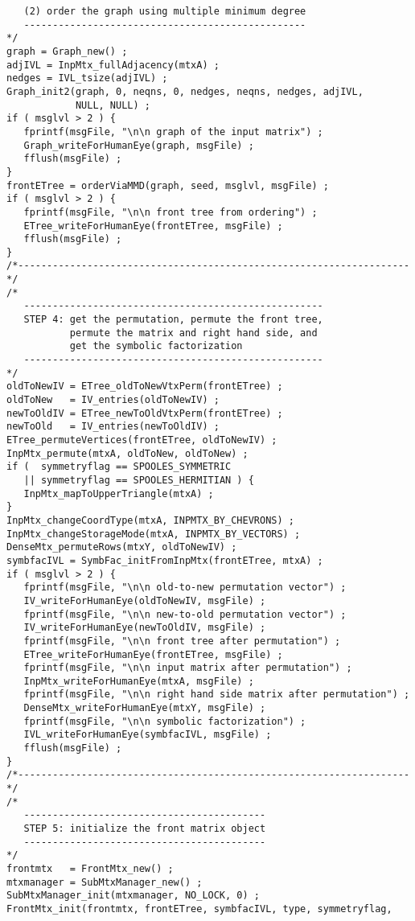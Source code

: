 \begin{verbatim}
   (2) order the graph using multiple minimum degree
   -------------------------------------------------
*/
graph = Graph_new() ;
adjIVL = InpMtx_fullAdjacency(mtxA) ;
nedges = IVL_tsize(adjIVL) ;
Graph_init2(graph, 0, neqns, 0, nedges, neqns, nedges, adjIVL,
            NULL, NULL) ;
if ( msglvl > 2 ) {
   fprintf(msgFile, "\n\n graph of the input matrix") ;
   Graph_writeForHumanEye(graph, msgFile) ;
   fflush(msgFile) ;
}
frontETree = orderViaMMD(graph, seed, msglvl, msgFile) ;
if ( msglvl > 2 ) {
   fprintf(msgFile, "\n\n front tree from ordering") ;
   ETree_writeForHumanEye(frontETree, msgFile) ;
   fflush(msgFile) ;
}
/*--------------------------------------------------------------------*/
/*
   ----------------------------------------------------
   STEP 4: get the permutation, permute the front tree,
           permute the matrix and right hand side, and 
           get the symbolic factorization
   ----------------------------------------------------
*/
oldToNewIV = ETree_oldToNewVtxPerm(frontETree) ;
oldToNew   = IV_entries(oldToNewIV) ;
newToOldIV = ETree_newToOldVtxPerm(frontETree) ;
newToOld   = IV_entries(newToOldIV) ;
ETree_permuteVertices(frontETree, oldToNewIV) ;
InpMtx_permute(mtxA, oldToNew, oldToNew) ;
if (  symmetryflag == SPOOLES_SYMMETRIC
   || symmetryflag == SPOOLES_HERMITIAN ) {
   InpMtx_mapToUpperTriangle(mtxA) ;
}
InpMtx_changeCoordType(mtxA, INPMTX_BY_CHEVRONS) ;
InpMtx_changeStorageMode(mtxA, INPMTX_BY_VECTORS) ;
DenseMtx_permuteRows(mtxY, oldToNewIV) ;
symbfacIVL = SymbFac_initFromInpMtx(frontETree, mtxA) ;
if ( msglvl > 2 ) {
   fprintf(msgFile, "\n\n old-to-new permutation vector") ;
   IV_writeForHumanEye(oldToNewIV, msgFile) ;
   fprintf(msgFile, "\n\n new-to-old permutation vector") ;
   IV_writeForHumanEye(newToOldIV, msgFile) ;
   fprintf(msgFile, "\n\n front tree after permutation") ;
   ETree_writeForHumanEye(frontETree, msgFile) ;
   fprintf(msgFile, "\n\n input matrix after permutation") ;
   InpMtx_writeForHumanEye(mtxA, msgFile) ;
   fprintf(msgFile, "\n\n right hand side matrix after permutation") ;
   DenseMtx_writeForHumanEye(mtxY, msgFile) ;
   fprintf(msgFile, "\n\n symbolic factorization") ;
   IVL_writeForHumanEye(symbfacIVL, msgFile) ;
   fflush(msgFile) ;
}
/*--------------------------------------------------------------------*/
/*
   ------------------------------------------
   STEP 5: initialize the front matrix object
   ------------------------------------------
*/
frontmtx   = FrontMtx_new() ;
mtxmanager = SubMtxManager_new() ;
SubMtxManager_init(mtxmanager, NO_LOCK, 0) ;
FrontMtx_init(frontmtx, frontETree, symbfacIVL, type, symmetryflag, 

\end{verbatim}

